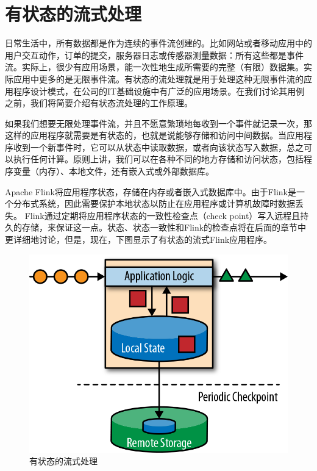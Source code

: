 \documentclass[cn,11pt,chinese]{elegantbook}
\begin{document}
\hypertarget{ux6709ux72b6ux6001ux7684ux6d41ux5f0fux5904ux7406-1}{%
\section{有状态的流式处理}\label{ux6709ux72b6ux6001ux7684ux6d41ux5f0fux5904ux7406-1}}

日常生活中，所有数据都是作为连续的事件流创建的。比如网站或者移动应用中的用户交互动作，订单的提交，服务器日志或传感器测量数据：所有这些都是事件流。实际上，很少有应用场景，能一次性地生成所需要的完整（有限）数据集。实际应用中更多的是无限事件流。有状态的流处理就是用于处理这种无限事件流的应用程序设计模式，在公司的IT基础设施中有广泛的应用场景。在我们讨论其用例之前，我们将简要介绍有状态流处理的工作原理。

如果我们想要无限处理事件流，并且不愿意繁琐地每收到一个事件就记录一次，那这样的应用程序就需要是有状态的，也就是说能够存储和访问中间数据。当应用程序收到一个新事件时，它可以从状态中读取数据，或者向该状态写入数据，总之可以执行任何计算。原则上讲，我们可以在各种不同的地方存储和访问状态，包括程序变量（内存）、本地文件，还有嵌入式或外部数据库。

Apache
Flink将应用程序状态，存储在内存或者嵌入式数据库中。由于Flink是一个分布式系统，因此需要保护本地状态以防止在应用程序或计算机故障时数据丢失。
Flink通过定期将应用程序状态的一致性检查点（check
point）写入远程且持久的存储，来保证这一点。状态、状态一致性和Flink的检查点将在后面的章节中更详细地讨论，但是，现在，下图显示了有状态的流式Flink应用程序。

\begin{figure}
\centering
\includegraphics{images/spaf_0104.png}
\caption{有状态的流式处理}
\end{figure}
\end{document}
